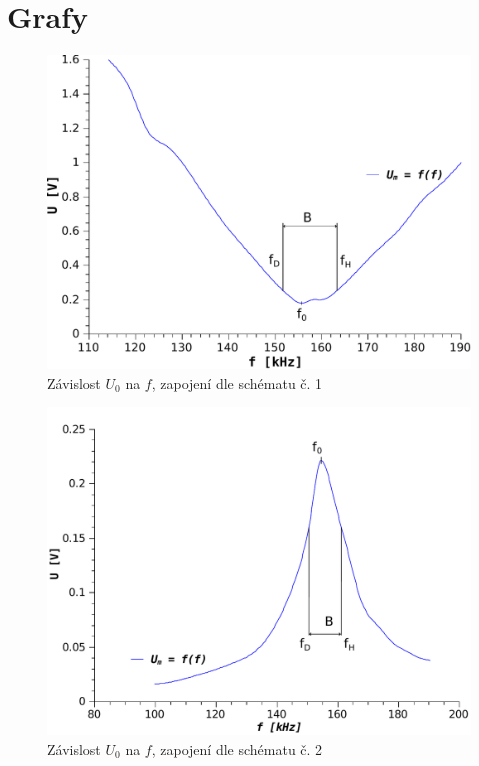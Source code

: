 \section{Grafy}
\setcounter{figure}{0}
  \renewcommand{\figurename}{Graf č.}
  
  \begin{figure}[H]
    \centering
    \includegraphics[width=13cm]{../img/g1.pdf}
    \caption{Závislost $U_0$ na $f$, zapojení dle schématu č. 1}
    \label{graf:1}
  \end{figure}
  
  \begin{figure}[H]
    \centering
    \includegraphics[width=13cm]{../img/g2.pdf}
    \caption{Závislost $U_0$ na $f$, zapojení dle schématu č. 2}
    \label{graf:2}
  \end{figure}


